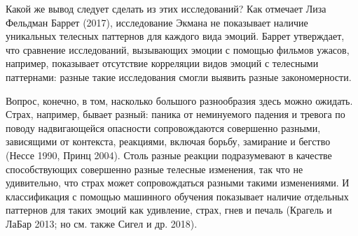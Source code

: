 \documentclass[11pt]{book}
\begin{document}
Какой же вывод следует сделать из этих исследований? Как отмечает Лиза Фельдман Баррет (2017), исследование Экмана не показывает наличие уникальных телесных паттернов для каждого вида эмоций. Баррет утверждает, что сравнение исследований, вызывающих эмоции с помощью фильмов ужасов, например, показывает отсутствие корреляции видов эмоций с телесными паттернами: разные такие исследования смогли выявить разные закономерности.

Вопрос, конечно, в том, насколько большого разнообразия здесь можно ожидать. Страх, например, бывает разный: паника от неминуемого падения и тревога по поводу надвигающейся опасности сопровождаются совершенно разными, зависящими от контекста, реакциями, включая борьбу, замирание и бегство (Нессе 1990, Принц 2004). Столь разные реакции подразумевают в качестве способствующих совершенно разные телесные изменения, так что не удивительно, что страх может сопровождаться разными такими изменениями. И классификация с помощью машинного обучения показывает наличие отдельных паттернов для таких эмоций как удивление, страх, гнев и печаль (Крагель и ЛаБар 2013; но см. также Сигел и др. 2018).
\end{document}
